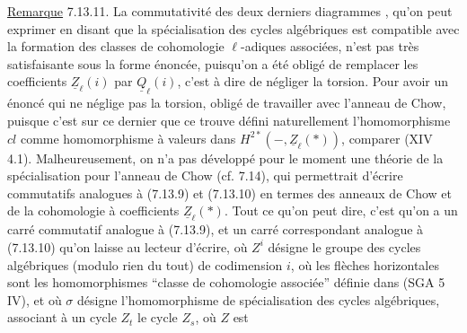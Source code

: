 
 \uline{Remarque} 7.13.11. La commutativité des deux derniers diagrammes , qu'on peut exprimer en disant que la spécialisation des cycles algébriques est compatible avec la formation des classes de cohomologie $\ell$-adiques associées, n'est pas très satisfaisante sous la forme énoncée, puisqu'on  a été obligé de remplacer les coefficients $\underline Z_{\ell}(i)$ par $\underline Q_{\ell}(i)$, c'est à dire de négliger la torsion. Pour avoir un énoncé qui ne néglige pas la torsion,  obligé de travailler avec l'anneau de Chow, puisque c'est sur ce dernier que ce trouve défini naturellement l'homomorphisme $cl$ comme homomorphisme à valeurs dans $H^{2*}(-,\underline Z_{\ell}(*))$,  comparer (XIV 4.1). Malheureusement, on n'a pas développé pour le moment une théorie de la spécialisation pour l'anneau de Chow\deleted{\unsure{,}} (cf. 7.14), qui permettrait d'écrire  commutatifs analogues à (7.13.9) et (7.13.10) en termes des anneaux de Chow et de la cohomologie à coefficients $\underline Z_{\ell}(*)$. Tout ce qu'on peut dire,  c'est qu'on a un carré commutatif
 analogue à (7.13.9), et un carré correspondant analogue à (7.13.10) qu'on laisse au lecteur  d'écrire, où $Z^i$ désigne le groupe des cycles algébriques (modulo rien du tout) de codimension $i$,  où les flèches horizontales sont les homomorphismes ``classe de cohomologie associée'' définie dans (SGA 5 IV), et où $\sigma$ désigne l'homomorphisme de spécialisation des cycles algébriques, associant à un cycle $Z_t$ le cycle $Z_s$, où $Z$ est

